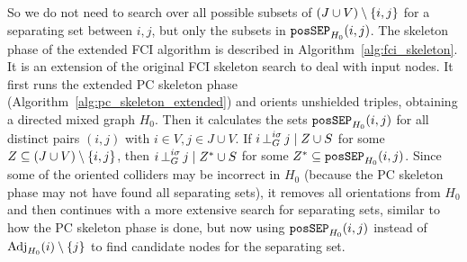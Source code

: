 So we do not need to search over all possible subsets of $(J \cup V) \setminus \{i,j\}$ for a separating set between $i,j$, but only the subsets in $\mathtt{posSEP}_{H_0}(i,j)$.
The skeleton phase of the extended FCI algorithm is described in Algorithm~\ref{alg:fci_skeleton}. 
It is an extension of the original FCI skeleton search \cite{SMR1995} to deal with input nodes. 
It first runs the extended PC skeleton phase (Algorithm~\ref{alg:pc_skeleton_extended}) and orients unshielded triples, obtaining a directed mixed graph $H_0$. 
Then it calculates the sets $\mathtt{posSEP}_{H_0}(i,j)$ for all distinct pairs $(i,j)$ with $i \in V, j \in J \cup V$.
If $i \operatorname*{\perp}^{i\sigma}_G j \mid Z \cup S$ for some $Z \subseteq (J \cup V) \setminus \{i,j\}$, then
$i \operatorname*{\perp}^{i\sigma}_G j \mid Z^* \cup S$ for some $Z^* \subseteq \mathtt{posSEP}_{H_0}(i,j)$.
Since some of the oriented colliders may be incorrect in $H_0$ (because the PC skeleton phase may not have found all separating sets), it removes all orientations from $H_0$ and then continues with a more extensive search for separating sets, similar
to how the PC skeleton phase is done, but now using $\mathtt{posSEP}_{H_0}(i,j)$ instead of $\mathrm{Adj}_{H_0}(i)\setminus\{j\}$ to find candidate nodes for the separating set.

